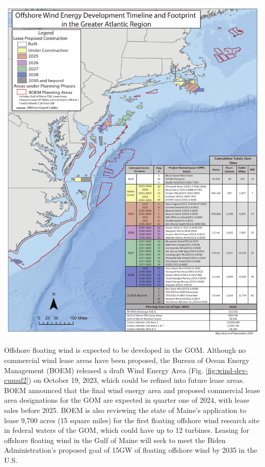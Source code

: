 \documentclass[
  10pt,
]{article}
\let\origfigure\figure
\let\endorigfigure\endfigure
\renewenvironment{figure}[1][2] {
    \expandafter\origfigure\expandafter[H]
} {
    \endorigfigure
}
\begin{document}
\begin{figure}

{\centering \includegraphics[width=0.9\linewidth]{SOE-NEFMC_files/figure-latex/wind-dev-cumul2-1} 

}

\caption{All Northeast Project areas by year construction ends (each project has 2 year construction period).}\label{fig:wind-dev-cumul2}
\end{figure}
\newpage

Offshore floating wind is expected to be developed in the GOM. Although no commercial wind lease areas have been proposed, the Bureau of Ocean Energy Management (BOEM) released a draft Wind Energy Area (Fig. \ref{fig:wind-dev-cumul2}) on October 19, 2023, which could be refined into future lease areas. BOEM announced that the final wind energy area and proposed commercial lease area designations for the GOM are expected in quarter one of 2024, with lease sales before 2025. BOEM is also reviewing the state of Maine's application to lease 9,700 acres (15 square miles) for the first floating offshore wind research site in federal waters of the GOM, which could have up to 12 turbines. Leasing for offshore floating wind in the Gulf of Maine will seek to meet the Biden Administration's proposed goal of 15GW of floating offshore wind by 2035 in the U.S.
\end{document}
